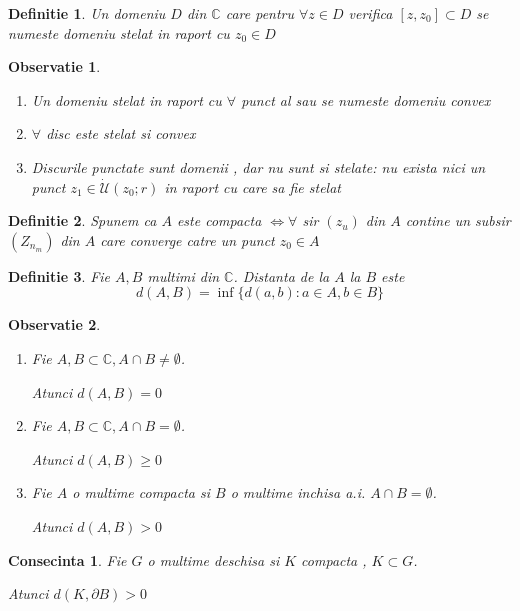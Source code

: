 \documentclass[10pt,a4paper]{article}
\newtheorem{definition}{Definitie}
\newtheorem{observation}{Observatie}
\newtheorem{consequence}{Consecinta}
\newcommand{\C}{\ensuremath{\mathbb{C}}}
\begin{document}
\begin{definition}
	Un domeniu $D$ din $\C$ care pentru $\forall z \in D$ verifica
	$[z,z_0]\subset D$ se numeste domeniu stelat in raport cu $z_0 \in D$
\end{definition}

\begin{observation}\leavevmode
	\begin{enumerate}
		\item Un domeniu stelat in raport cu $\forall$ punct al sau se numeste
		 domeniu convex
		\item $\forall$ disc este stelat si convex
		\item Discurile punctate sunt domenii , dar nu sunt si stelate: nu exista
		 nici un punct $z_1 \in \dot{\mathcal{U}}(z_0;r)$ in raport cu care sa fie stelat
	\end{enumerate}
\end{observation}

\begin{definition}
	Spunem ca $A$ este compacta $\iff \forall$ sir $(z_u)$ din $A$ contine un
	subsir $(Z_{n_m})$ din $A$ care converge catre un punct $z_0 \in A$
\end{definition}

\begin{definition}
	Fie $A, B$ multimi din $\C$. Distanta de la $A$ la $B$ este
	\begin{equation}
		d(A,B) = \inf\{d(a,b)\colon a \in A , b \in B \}
	\end{equation}
\end{definition}

\begin{observation}\leavevmode
\begin{enumerate}
	\item Fie $A, B \subset \C, A \cap B \neq \emptyset$.

	Atunci $d(A, B) = 0$

	\item Fie $A, B \subset \C, A \cap B = \emptyset$.

	Atunci $d(A, B) \geq 0$

	\item Fie $A$ o multime compacta si $B$ o multime inchisa a.i. $A \cap B = \emptyset$.

	Atunci $d(A, B) > 0$
\end{enumerate}
\end{observation}

\begin{consequence}
	Fie $G$ o multime deschisa si $K$ compacta , $K\subset G$.

	Atunci $d(K,\partial B)>0$
\end{consequence}
\end{document}
